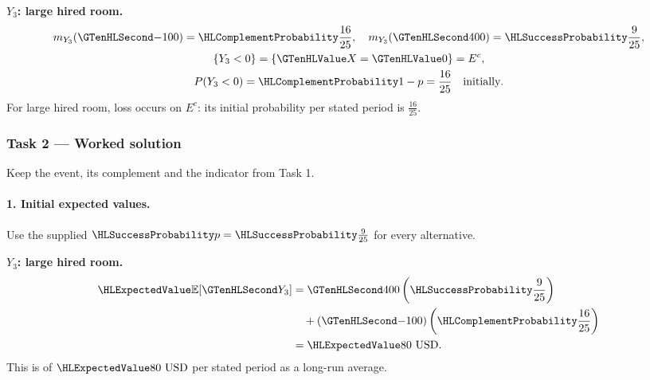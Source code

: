 \noindent\begin{minipage}[t]{.48\linewidth}
\textbf{$Y_3$: large hired room.}
\[
\begin{gathered}
m_{Y_3}(\Money{-100})=\FailureProb{\frac{16}{25}},\quad m_{Y_3}(\Money{400})=\SuccessProb{\frac{9}{25}},\\
\{Y_3<0\}=\{\Indicator{X}=\Indicator{0}\}=E^c,\\
P(Y_3<0)=\FailureProb{1-p}= \frac{16}{25}\quad\text{initially}.
\end{gathered}
\]
For large hired room, loss occurs on $E^c$: its initial probability per stated period is $\frac{16}{25}$.
\end{minipage}\par
{}
\clearpage\subsubsection*{Task 2 --- Worked solution}\label{sol:c3-restaurant-decision}
Keep the event, its complement and the indicator from Task 1.
\paragraph{1. Initial expected values.}
Use the supplied $\SuccessProb{p}=\SuccessProb{\frac{9}{25}}$ for every alternative.
\noindent\begin{minipage}[t]{.48\linewidth}
\textbf{$Y_3$: large hired room.}
\[
\begin{aligned}
\ExpectedValue{\mathbb E}[\Money{Y_3}]&=\Money{400}\left(\SuccessProb{\frac{9}{25}}\right)\\
&\quad +(\Money{-100})\left(\FailureProb{\frac{16}{25}}\right)\\
&=\ExpectedValue{80\ \text{USD}}.
\end{aligned}
\]
This is  of $\ExpectedValue{80\ \text{USD}}$ per stated period as a long-run average.
\end{minipage}\par
